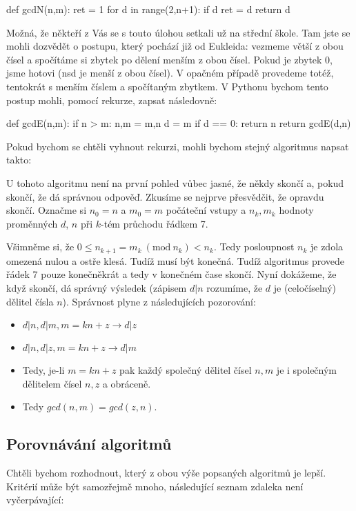\begin{python}
def gcdN(n,m):
    ret = 1
    for d in range(2,n+1):
        if d %
            ret = d
    return d
\end{python}

Možná, že někteří z Vás se s touto úlohou setkali už na střední škole. Tam jste se mohli dozvědět o postupu, který 
pochází již od Eukleida: vezmeme větší z obou čísel a spočítáme si zbytek po dělení menším z obou čísel. Pokud je
zbytek 0, jsme hotovi (nsd je menší z obou čísel). V opačném případě provedeme totéž, tentokrát s menším číslem 
a spočítaným zbytkem. V Pythonu bychom tento postup mohli, pomocí rekurze, zapsat následovně:

\begin{python}
def gcdE(n,m):
    if n > m:
        n,m = m,n
    d = m %
    if d == 0:
        return n
    return gcdE(d,n)
\end{python}

Pokud bychom se chtěli vyhnout rekurzi, mohli bychom stejný algoritmus napsat takto:


U tohoto algoritmu není na první pohled vůbec jasné, že někdy skončí a, pokud skončí, že dá správnou odpověď.
Zkusíme se nejprve přesvědčit, že opravdu skončí. Označme si $n_0 = n$ a $m_0=m$ počáteční vstupy a $n_k, m_k$ hodnoty proměnných 
$d$, $n$ při $k$-tém průchodu řádkem 7. 

Všimněme si, že $0\leq n_{k+1} = m_k\ (\mbox{mod}\ n_k) <n_k$. Tedy posloupnost $n_k$ je zdola omezená
nulou a ostře klesá. Tudíž musí být konečná. Tudíž algoritmus provede řádek 7 pouze konečněkrát a tedy v konečném
čase skončí. Nyní dokážeme, že když skončí, dá správný výsledek (zápisem $d|n$ rozumíme, že $d$ je (celočíselný) dělitel čísla $n$). Správnost
plyne z následujících pozorování:

\begin{itemize}
 \item $d|n, d|m, m = kn + z \rightarrow d|z$
 \item $d|n, d|z, m = kn + z \rightarrow d|m$
 \item Tedy, je-li $m = kn + z$ pak každý společný dělitel čísel $n,m$ je i společným dělitelem čísel $n,z$ a obráceně.
 \item Tedy $gcd(n,m) = gcd(z,n)$.
\end{itemize}

\subsection{Porovnávání algoritmů} 
Chtěli bychom rozhodnout, který z obou výše popsaných algoritmů je lepší. Kritérií může být samozřejmě mnoho,
následující seznam zdaleka není vyčerpávající:

